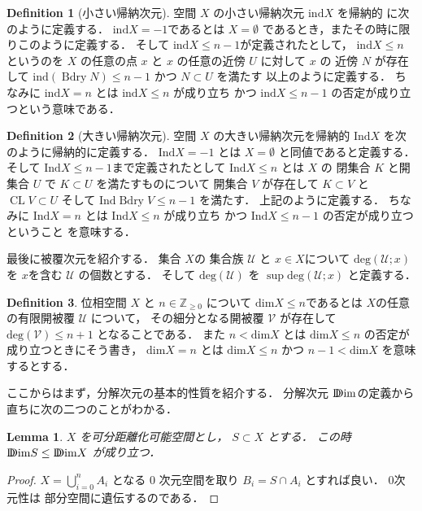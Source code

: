 \documentclass[leqno, a4paper, 12pt]{jsarticle}
\theoremstyle{plain}
\newtheorem{lem}[thm]{Lemma}
\theoremstyle{definition}
\newtheorem{df}{Definition}[section]
\theoremstyle{remark}
\newcommand{\zz}{\mathbb{Z}}
\DeclareMathOperator{\bd}{\mathrm{Bdry}}
\DeclareMathOperator{\cl}{\mathrm{CL}}
\newcommand{\yoind}{\mathrm{ind}}
\newcommand{\yolind}{\mathrm{Ind}}
\newcommand{\yoddim}{\mathrm{D\hspace{-5.5pt}Dim}}
\newcommand{\yodim}{\mathrm{dim}}
\newcommand{\yodeg}{\mathrm{deg}}
\newcommand{\yocovf}[1]{\mathscr{#1}}
\numberwithin{equation}{section}
\begin{document}
\begin{df}[小さい帰納次元]
空間
$X$
の小さい帰納次元
$\yoind X$
を帰納的
に次のように定義する．
$\yoind X=-1$であるとは
$X=\emptyset$
であるとき，またその時に限りこのように定義する．
そして
$\yoind X\le n-1$が定義されたとして，
$\yoind X\le n$
というのを
$X$
の任意の点
$x$
と
$x$
の任意の近傍
$U$
に対して
$x$
の
近傍
$N$
が存在して
$\yoind (\bd N)\le n-1$
かつ
$N\subset U$
を満たす
以上のように定義する．
ちなみに
$\yoind X=n$
とは
$\yoind X\le n$
が成り立ち
かつ
$\yoind X\le n-1$
の否定が成り立つという意味である．
\end{df}





\begin{df}[大きい帰納次元]
空間
$X$
の大きい帰納次元を帰納的
$\yolind X$
を次のように帰納的に定義する．
$\yolind X=-1$
とは
$X=\emptyset$
と同値であると定義する．
そして
$\yolind X \le n-1$まで定義されたとして
$\yolind X\le n$
とは
$X$
の
閉集合
$K$
と開集合
$U$
で
$K\subset U$
を満たすものについて
開集合
$V$
が存在して
$K\subset V$
と
$\cl V\subset U$
そして
$\yolind\bd V\le n-1$
を満たす．
上記のように定義する．
ちなみに
$\yolind X=n$
とは
$\yolind X\le n$
が成り立ち
かつ
$\yolind X\le n-1$
の否定が成り立つということ
を意味する．
\end{df}




最後に被覆次元を紹介する．
集合
$X$の
集合族
$\yocovf{U}$
と
$x\in X$について
$\yodeg(\yocovf{U}; x)$
を
$x$を含む
$\yocovf{U}$
の個数とする．
そして
$\yodeg({\yocovf{U}})$
を
$\sup \yodeg(\yocovf{U}; x)$
と定義する．




\begin{df}
位相空間
$X$
と
$n\in \zz_{\ge 0}$
について
$\yodim X\le n$であるとは
$X$の任意の有限開被覆
$\yocovf{U}$
について，
その細分となる開被覆
$\yocovf{V}$
が存在して
$\yodeg(\yocovf{V})\le n+1$
となることである．
また
$n<\yodim X$
とは
$\yodim X\le n$
の否定が成り立つときにそう書き，
$\yodim X=n$
とは
$\yodim X\le n$
かつ
$n-1<\yodim X$
を意味するとする．
\end{df}



ここからはまず，分解次元の基本的性質を紹介する．
分解次元
$\yoddim$の定義から直ちに次の二つのことがわかる．
\begin{lem}\label{lem:ddim:monotone}
$X$
を可分距離化可能空間とし，
$S\subset X$
とする．
この時
$\yoddim S\le \yoddim X$
が成り立つ．
\end{lem}
\begin{proof}
$X=\bigcup_{i=0}^{n}A_{i}$
となる
$0$
次元空間を取り
$B_{i}=S\cap A_{i}$
とすれば良い．
$0$次元性は
部分空間に遺伝するのである．
\end{proof}
\end{document}
